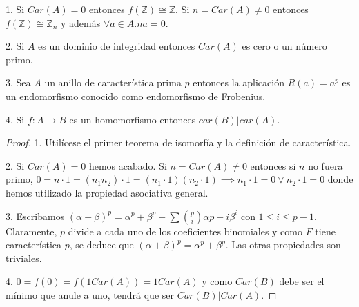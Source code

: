 \begin{proposition}
1. Si $Car(A) = 0$ entonces $f(\mathbb{Z}) \cong \mathbb{Z}$. Si $n = Car(A) \neq 0$ entonces $f(\mathbb{Z}) \cong \mathbb{Z}_n$ y además $\forall a \in A.na  = 0$. 

2. Si $A$ es un dominio de integridad entonces $Car(A)$ es cero o un número primo. 

3. Sea $A$ un anillo de característica prima $p$ entonces la aplicación $R(a) = a^p$ es un endomorfismo conocido como endomorfismo de Frobenius.

4. Si $f: A \to B$ es un homomorfismo entonces $car(B)|car(A)$. 
\end{proposition}
\begin{proof}
1. Utilícese el primer teorema de isomorfía y la definición de característica.

2. Si $Car(A) = 0$ hemos acabado. Si $n = Car(A) \neq 0$ entonces si $n$ no fuera primo, $0 = n \cdot 1 = (n_1n_2) \cdot 1 = (n_1 \cdot 1)(n_2 \cdot 1) \implies n_1 \cdot 1 = 0 \lor n_2 \cdot 1 = 0$ donde hemos utilizado la propiedad asociativa general.  

3. Escribamos $(\alpha+\beta)^p = \alpha^p + \beta^p + \sum \binom{p}{i} \alpha{p-i}\beta^i$ con $1 \le i \le p-1$. Claramente, $p$ divide a cada uno de los coeficientes binomiales y como $F$ tiene característica $p$, se deduce que $(\alpha+\beta)^p = \alpha^p+\beta^p$. Las otras propiedades son triviales.

4. $0 = f(0) = f(1 Car(A)) = 1 Car(A)$ y como $Car(B)$ debe ser el mínimo que anule a uno, tendrá que ser $Car(B)|Car(A)$.  
\end{proof}

